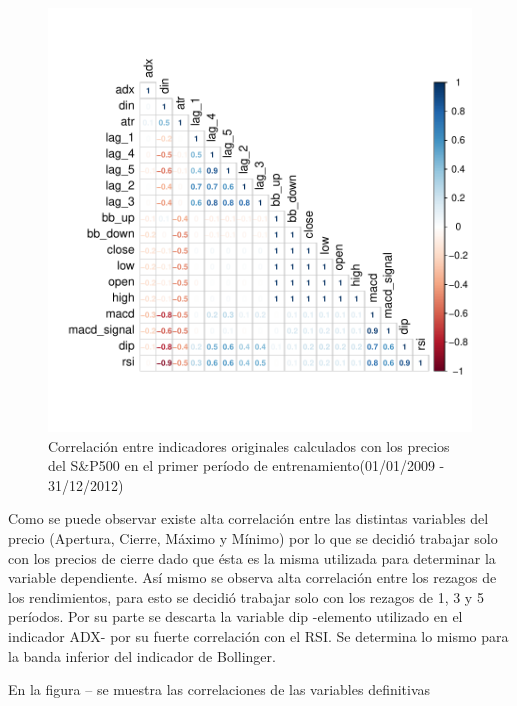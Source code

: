 \documentclass[a4paper,12pt]{Latex/Classes/PhDthesisPSnPDF}
\begin{document}
\begin{figure}[H]
\centering
\includegraphics{main-003}
\caption{Correlación entre indicadores originales calculados con los precios del S&P500 en el primer período de entrenamiento(01/01/2009 - 31/12/2012)}
\end{figure}

Como se puede observar existe alta correlación entre las distintas variables del precio (Apertura, Cierre, Máximo y Mínimo) por lo que se decidió trabajar solo con los precios de cierre dado que ésta es la misma utilizada para determinar la variable dependiente. Así mismo se observa alta correlación entre los rezagos de los rendimientos, para esto se decidió trabajar solo con los rezagos de 1, 3 y 5 períodos. Por su parte se descarta la variable dip -elemento utilizado en el indicador ADX- por su fuerte correlación con el RSI. Se determina lo mismo para la banda inferior del indicador de Bollinger.

En la figura -- se muestra las correlaciones de las variables definitivas
\end{document}

